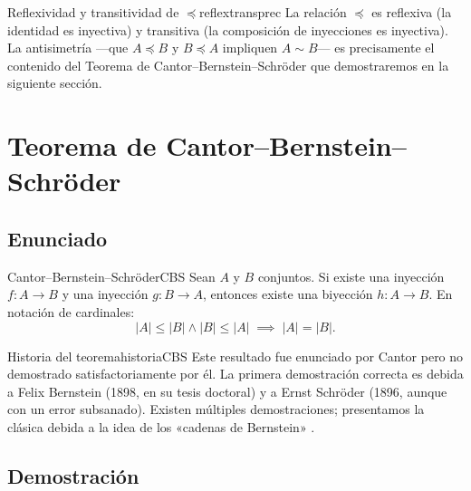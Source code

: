\begin{observacion}{Reflexividad y transitividad de $\preceq$}{reflextransprec}
La relación $\preceq$ es reflexiva (la identidad es inyectiva) y transitiva (la composición de inyecciones es inyectiva). La antisimetría —que $A \preceq B$ y $B \preceq A$ impliquen $A \sim B$— es precisamente el contenido del Teorema de Cantor–Bernstein–Schröder que demostraremos en la siguiente sección.
\end{observacion}

\section{Teorema de Cantor–Bernstein–Schröder}

\subsection{Enunciado}

\begin{teorema}{Cantor–Bernstein–Schröder}{CBS}
Sean $A$ y $B$ conjuntos. Si existe una inyección $f: A \to B$ y una inyección $g: B \to A$, entonces existe una biyección $h: A \to B$. En notación de cardinales:
\[
  |A| \leq |B| \wedge |B| \leq |A| \;\implies\; |A| = |B|.
\]
\end{teorema}

\begin{observacion}{Historia del teorema}{historiaCBS}
Este resultado fue enunciado por Cantor pero no demostrado satisfactoriamente por él. La primera demostración correcta es debida a Felix Bernstein (1898, en su tesis doctoral) y a Ernst Schröder (1896, aunque con un error subsanado). Existen múltiples demostraciones; presentamos la clásica debida a la idea de los «cadenas de Bernstein» \cite{jech2003, halmos1960, hrbacek1999}.
\end{observacion}

\subsection{Demostración}

